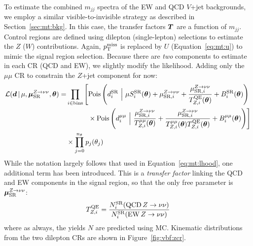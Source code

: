 To estimate the combined $m_{jj}$ spectra of the EW and QCD $V$+jet backgrounds, we employ a similar visible-to-invisible strategy as described in Section~\ref{sec:mt:bkg}.
In this case, the transfer factors $\bm{T}^{}_{}$ are a function of $m_{jj}$.
Control regions are defined using dilepton (single-lepton) selections to estimate the $Z$ ($W$) contributions.
Again, $p_\mathrm{T}^\mathrm{miss}$ is replaced by $U$ (Equation~\ref{eq:mt:u}) to mimic the signal region selection. 
Because there are \emph{two} components to estimate in each CR (QCD and EW), we slightly modify the likelihood.
Adding only the $\mu\mu$ CR to constrain the $Z$+jet component for now:
\begin{align}
    \mathcal{L}(\bm{d} \,|\, \mu,\muz,\bm{\theta}) = & \prod_{i\in\mathrm{bins}} \left[
    \pois\left(d^{\mathrm{SR}}_{i} ~\Big|~ \mu S^{\mathrm{SR}}_{i}(\bm\theta)  + \muzi + \frac{\muzi}{\Ti{\mathrm{QE}}{Z}(\bm\theta)} + B^{\mathrm{SR}}_{i}(\bm\theta)\right) \right. \nonumber \\
    & \left. \phantom{\prod_{i\in\mathrm{bins}}\Big[} \times \pois\left(d^{\mu\mu}_i~\Big|~ \frac{\muzi}{\Ti{\mu\mu}{Z}(\bm\theta)} + \frac{\muzi}{\Ti{\mu\mu}{Z}(\bm\theta) \Ti{\mathrm{QE}}{Z}(\bm\theta)} + B^{\mu\mu}_i(\bm\theta) \right)\right]  \nonumber \\ 
    & \times  \prod_{j=0}^{n_\theta} p_j(\theta_j)
\end{align}
While the notation largely follows that used in Equation~\ref{eq:mt:lhood}, one additional term has been introduced.
This is a \emph{transfer factor} linking the QCD and EW components in the signal region, so that the only free parameter is $\bm{\mu}_{\mathrm{SR}}^{Z\rightarrow\nu\nu}$:
\begin{equation}
    {T}^{\mathrm{QE}}_{Z,i} = \frac{N^\mathrm{SR}_i(\mathrm{QCD\,}Z\rightarrow\nu\nu)}{N^\mathrm{SR}_i(\mathrm{EW\,}Z\rightarrow\nu\nu)} 
\end{equation}
where as always, the yields $N$ are predicted using MC. 
Kinematic distributions from the two dilepton CRs are shown in Figure~\ref{fig:vbf:zcr}.

